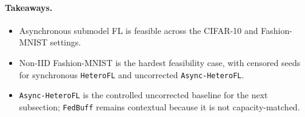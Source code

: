 \paragraph{Takeaways.}
\begin{itemize}[leftmargin=*, nosep]
  \item Asynchronous submodel FL is feasible across the CIFAR-10 and Fashion-MNIST settings.
  \item Non-IID Fashion-MNIST is the hardest feasibility case, with censored seeds for synchronous \texttt{HeteroFL} and uncorrected \texttt{Async-HeteroFL}.
  \item \texttt{Async-HeteroFL} is the controlled uncorrected baseline for the next subsection; \texttt{FedBuff} remains contextual because it is not capacity-matched.
\end{itemize}

